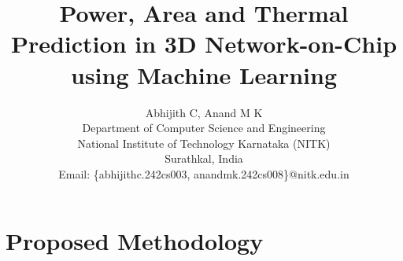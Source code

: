 \documentclass[conference]{IEEEtran}
\begin{document}
\title{Power, Area and Thermal Prediction in 3D Network-on-Chip using Machine Learning}

\author{Abhijith C, Anand M K \\

Department of Computer Science and Engineering \\ 
	National Institute of Technology Karnataka (NITK) \\ 
	Surathkal, India\\
Email: \{abhijithc.242cs003, anandmk.242cs008\}@nitk.edu.in}


\maketitle

\section{Proposed Methodology}
\end{document}
